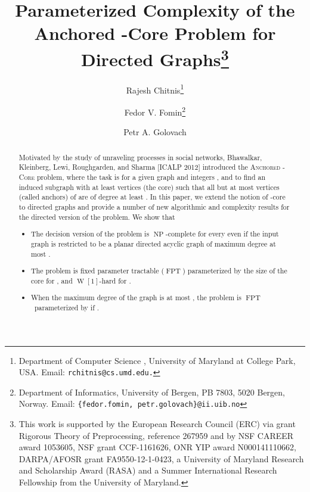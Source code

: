 \documentclass[11pt,a4paper]{article}
\DeclareMathOperator{\operatorClassNP}{NP}
\newcommand{\classNP}{\ensuremath{\operatorClassNP}}
\DeclareMathOperator{\operatorClassFPT}{FPT}
\newcommand{\classFPT}{\ensuremath{\operatorClassFPT}}
\DeclareMathOperator{\operatorClassW}{W}
\newcommand{\classW}[1]{\ensuremath{\operatorClassW[#1]}}
\begin{document}
\title{Parameterized Complexity of the Anchored -Core Problem for Directed Graphs\footnote{This work is supported by the European Research Council (ERC) via grant Rigorous Theory of Preprocessing, reference
267959 and by NSF CAREER award 1053605, NSF grant CCF-1161626, ONR YIP award N000141110662, DARPA/AFOSR grant FA9550-12-1-0423, a University
of Maryland Research and Scholarship Award (RASA) and a Summer International Research Fellowship from the University of
Maryland.
}}

\author{Rajesh Chitnis\thanks{Department of Computer Science , University of Maryland at College Park, USA. Email: {\tt rchitnis@cs.umd.edu.}}
\and
Fedor V. Fomin\thanks{Department of Informatics, University of Bergen, PB 7803, 5020 Bergen, Norway. Email: {\tt{\{fedor.fomin, petr.golovach\}@ii.uib.no}}}
\addtocounter{footnote}{-1}
\and 
Petr A. Golovach\footnotemark
}




\date{}

\maketitle


\begin{abstract} Motivated by the study of  unraveling processes in social networks,
Bhawalkar,   Kleinberg,   Lewi,   Roughgarden,  and Sharma [ICALP 2012] introduced the \textsc{Anchored -Core} problem,
where the task is  for a given graph  and integers , and  to find an induced subgraph   with at least 
vertices (the core) such that all but at most  vertices (called anchors) of   are of
degree at least . In this paper, we extend the notion of -core to directed graphs and provide a number of new
algorithmic and complexity results for the directed version of the problem. We show that
\begin{itemize}
\item
The decision version of the problem is   \classNP-complete for every   even if the input graph is restricted to be a planar directed acyclic graph of maximum degree at
most .
\item The problem is fixed parameter tractable (\classFPT) parameterized by the size of the core  for  , and \classW1-hard for .
\item When the maximum degree of the graph is at most ,   the
 problem is  \classFPT\  parameterized by  if .
\end{itemize}
\end{abstract}
\end{document}
